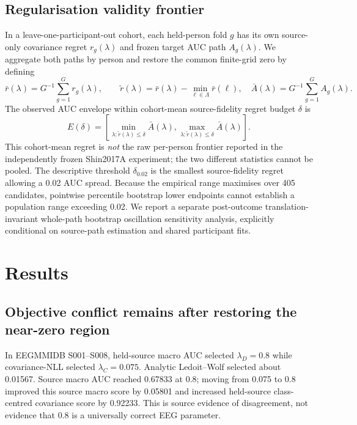 \documentclass[11pt,a4paper]{article}
\begin{document}
\subsection{Regularisation validity frontier}
In a leave-one-participant-out cohort, each held-person fold \(g\) has
its own source-only covariance regret \(r_g(\lambda)\) and frozen target
AUC path \(A_g(\lambda)\). We aggregate both paths by person and restore
the common finite-grid zero by defining
\[
 \bar r(\lambda)=G^{-1}\sum_{g=1}^{G}r_g(\lambda),\qquad
 \widetilde r(\lambda)=\bar r(\lambda)-\min_{\ell\in\Lambda}\bar r(\ell),
 \quad \bar A(\lambda)=G^{-1}\sum_{g=1}^{G}A_g(\lambda).
\]
The observed AUC envelope within cohort-mean source-fidelity
regret budget \(\delta\) is
\[
 E(\delta)=
 \left[
 \min_{\lambda:\widetilde r(\lambda)\le\delta}\bar A(\lambda),
 \max_{\lambda:\widetilde r(\lambda)\le\delta}\bar A(\lambda)
 \right].
\]
This cohort-mean regret is \emph{not} the raw per-person frontier
reported in the independently frozen Shin2017A experiment; the two
different statistics cannot be pooled.
The descriptive threshold \(\delta_{0.02}\) is the smallest source-fidelity
regret allowing a 0.02 AUC spread. Because the empirical range
maximises over 405 candidates, pointwise percentile bootstrap lower
endpoints cannot establish a population range exceeding 0.02. We report
a separate post-outcome translation-invariant whole-path bootstrap
oscillation sensitivity analysis, explicitly conditional on source-path
estimation and shared participant fits.

\section{Results}
\subsection{Objective conflict remains after restoring the near-zero region}
In EEGMMIDB S001--S008, held-source macro AUC selected
\(\lambda_D=0.8\) while covariance-NLL selected \(\lambda_C=0.075\).
Analytic Ledoit--Wolf selected about 0.01567. Source macro AUC reached
0.67833 at 0.8; moving from 0.075 to 0.8 improved this source macro
score by 0.05801 and increased held-source class-centred covariance score by 0.92233.
This is source evidence of disagreement, not evidence that 0.8 is a
universally correct EEG parameter.
\end{document}
